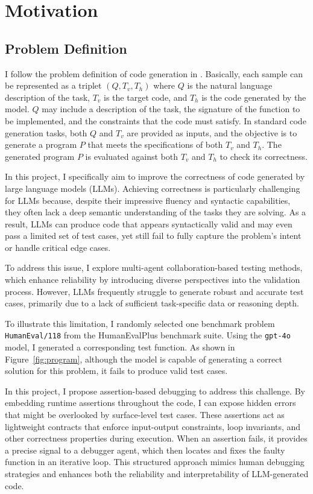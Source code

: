 
\section{Motivation}

\subsection{Problem Definition}

I follow the problem definition of code generation in \cite{TeachSelfDebug}. Basically, each sample
can be represented as a triplet $(Q, T_v, T_h)$ where $Q$ is the natural language description of the task, $T_v$ is the target code, and $T_h$ is the code generated by the model. $Q$ may include a description of the task, the signature of the function to be implemented, and the constraints that the code must satisfy. In standard code generation tasks, both $Q$ and $T_v$ are provided as inputs, and the objective is to generate a program $P$ that meets the specifications of both $T_v$ and $T_h$. The generated program $P$ is evaluated against both $T_v$ and $T_h$ to check its correctness.

In this project, I specifically aim to improve the correctness of code generated by large language models (LLMs). Achieving correctness is particularly challenging for LLMs because, despite their impressive fluency and syntactic capabilities, they often lack a deep semantic understanding of the tasks they are solving. As a result, LLMs can produce code that appears syntactically valid and may even pass a limited set of test cases, yet still fail to fully capture the problem's intent or handle critical edge cases.

To address this issue, I explore multi-agent collaboration-based testing methods, which enhance reliability by introducing diverse perspectives into the validation process. However, LLMs frequently struggle to generate robust and accurate test cases, primarily due to a lack of sufficient task-specific data or reasoning depth.

To illustrate this limitation, I randomly selected one benchmark problem \texttt{HumanEval/118} from the HumanEvalPlus benchmark suite. Using the \texttt{gpt-4o} model, I generated a corresponding test function. As shown in Figure~\ref{fig:program}, although the model is capable of generating a correct solution for this problem, it fails to produce valid test cases. 

In this project, I propose assertion-based debugging to address this challenge. By embedding runtime assertions throughout the code, I can expose hidden errors that might be overlooked by surface-level test cases. These assertions act as lightweight contracts that enforce input-output constraints, loop invariants, and other correctness properties during execution. When an assertion fails, it provides a precise signal to a debugger agent, which then locates and fixes the faulty function in an iterative loop. This structured approach mimics human debugging strategies and enhances both the reliability and interpretability of LLM-generated code.


